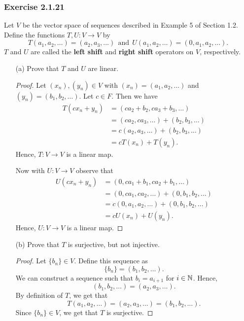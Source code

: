 \subsubsection{Exercise 2.1.21}\label{Exercise 21} Let \( V  \) be the vector space of sequences described in Example 5 of Section 1.2. Define the functions \( T,U : V \to V  \) by 
\[  T(a_{1}, a_{2}, \dots ) = (a_{2}, a_{3}, \dots ) \ \  \text{and} \ \ U(a_{1}, a_{2}, \dots ) = (0, a_{1}, a_{2}, \dots).  \]
\( T \) and \( U  \) are called the \textbf{left shift} and \textbf{right shift} operators on \( V  \), respectively. 
\begin{enumerate}
    \item[(a)] Prove that \( T  \) and \( U  \) are linear.
        \begin{proof}
        Let \( (x_{n}), (y_{n}) \in V  \) with \( (x_{n}) = (a_{1}, a_{2}, \dots ) \) and \( (y_{n}) = (b_{1}, b_{2}, \dots ) \). Let \( c \in F  \). Then we have 
        \begin{align*}
            T(cx_{n} + y_{n}) &= (ca_{2} + b_{2}, ca_{3} + b_{3}, \dots ) \\
                              &= (ca_{2}, ca_{3}, \dots ) + (b_{2},  b_{3}, \dots ) \\
                              &= c(a_{2}, a_{3}, \dots ) + (b_{2}, b_{3}, \dots) \\
                              &= c T(x_{n}) + T(y_{n}).
        \end{align*}
        Hence, \( T: V \to V   \) is a linear map.

        Now with \( U: V \to V  \) observe that
        \begin{align*}
            U(cx_{n} + y_{n}) &= (0, ca_{1} + b_{1}, ca_{2} + b_{1}, \dots ) \\
                              &= (0, ca_{1}, ca_{2}, \dots) + (0, b_{1}, b_{2}, \dots) \\
                              &= c(0, a_{1}, a_{2}, \dots ) + (0, b_{1}, b_{2}, \dots ) \\ 
                              &= c U(x_{n}) + U(y_{n}).
        \end{align*}
        Hence, \( U: V \to V   \) is a linear map.
        \end{proof}
    \item[(b)] Prove that \( T \) is surjective, but not injective.
        \begin{proof}
        Let \( \{ b_{n} \}  \in V  \). Define this sequence as 
        \[  \{ b_{n} \}  =  (b_{1}, b_{2}, \dots ). \]
        We can construct a sequence such that \( b_{i} = a_{i+1}  \) for \( i \in \mathbb{N} \). Hence, 
        \[  (b_{1}, b_{2}, \dots)  = (a_{2}, a_{3}, \dots ).\]
        By definition of \( T  \), we get that
        \[  T(a_{1}, a_{2}, \dots ) = (a_{2}, a_{3}, \dots) = (b_{1}, b_{2}, \dots). \]
        Since \( \{ b_{n} \} \in V  \), we get that \( T  \) is surjective. 


\end{proof}
\end{enumerate}
